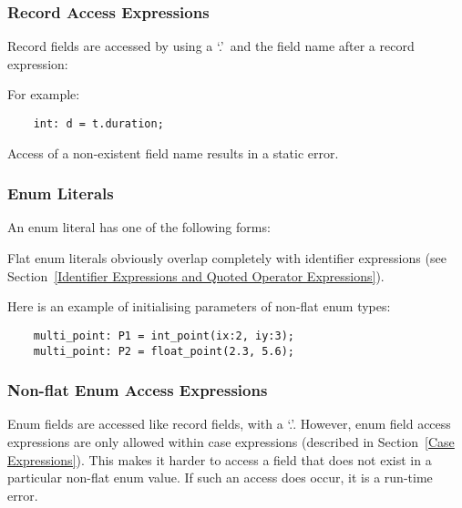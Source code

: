 \documentclass[10pt]{scrartcl}
\begin{document}
{%
\subsubsection{Record Access Expressions}
        \label{Record Access Expressions}
Record fields are accessed by using a `.'\ and the field name after a record
expression:
\begin{productions}
    \RuleRecordAccessTail
\end{productions}
For example:
\begin{verbatim}
    int: d = t.duration;
\end{verbatim}
Access of a non-existent field name results in a static error.


\subsubsection{Enum Literals}
        \label{Enum Literals}
An enum literal has one of the following forms:
\begin{productions}
    \RuleEnumLiteral
\end{productions}
Flat enum literals obviously overlap completely with identifier
expressions (see Section~\ref{Identifier Expressions and Quoted Operator
Expressions}).

Here is an example of initialising parameters of non-flat enum types:
\begin{verbatim}
    multi_point: P1 = int_point(ix:2, iy:3);
    multi_point: P2 = float_point(2.3, 5.6);
\end{verbatim}


\subsubsection{Non-flat Enum Access Expressions}
        \label{Non-flat Enum Access Expressions}
Enum fields are accessed like record fields, with a `.'.  However, enum
field access expressions are only allowed within case expressions (described
in Section~\ref{Case Expressions}).  This makes it harder to access a field
that does not exist in a particular non-flat enum value.  If such an access
does occur, it is a run-time error.
}
\end{document}

